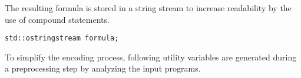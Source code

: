 The resulting formula is stored in a string stream to increase readability by the use of compound statements.
\begin{lstlisting}[style=c++]
std::ostringstream formula;
\end{lstlisting}
To simplify the encoding process,  following utility variables are generated during a preprocessing step by analyzing the input programs.
